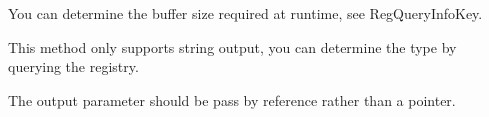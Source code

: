 
\begin{DoxyRefList}
\item[\label{todo__todo000002}%
\hypertarget{todo__todo000002}{}%
Member \hyperlink{class_direct_registry_access_aa123bf857d78ceb45ef406535869c6b1}{Direct\+Registry\+Access\+:\+:get\+Sub\+Key\+Name\+At} (const H\+K\+E\+Y \&root\+\_\+key, int n, std\+::string \&key\+\_\+name)]You can determine the buffer size required at runtime, see Reg\+Query\+Info\+Key.  
\item[\label{todo__todo000003}%
\hypertarget{todo__todo000003}{}%
Member \hyperlink{class_direct_registry_access_a0c4addcf0e776cdecead314ef7427f73}{Direct\+Registry\+Access\+:\+:get\+Value\+From\+Key} (H\+K\+E\+Y \&h\+\_\+key, std\+::string search\+\_\+value\+\_\+name, std\+::string $\ast$value)]This method only supports string output, you can determine the type by querying the registry.

The output parameter should be pass by reference rather than a pointer.


\end{DoxyRefList}
